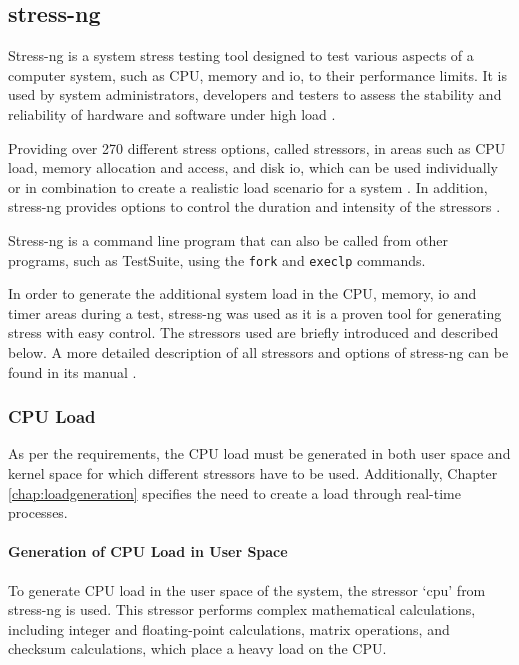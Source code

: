 \subsection{stress-ng} 
Stress-ng is a  system stress testing tool designed to test various aspects of a computer system, such as \ac{CPU}, memory and \ac{io}, to their performance limits. It is used by system administrators, developers and testers to assess the stability and reliability of hardware and software under high load \cite{stress01}.

Providing over 270 different stress options, called stressors, in areas such as \ac{CPU} load, memory allocation and access, and disk \ac{io}, which can be used individually or in combination to create a realistic load scenario for a system \cite{stress02}. In addition, stress-ng provides options to control the duration and intensity of the stressors \cite{stress03}.

Stress-ng is a command line program that can also be called from other programs, such as TestSuite, using the \texttt{fork} \cite{stress04} and \texttt{execlp} \cite{stress05} commands.

In order to generate the additional system load in the \ac{CPU}, memory, \ac{io} and timer areas during a test, stress-ng was used as it is a proven tool for generating stress with easy control. The stressors used are briefly introduced and described below. A more detailed description of all stressors and options of stress-ng can be found in its manual \cite{stress03}.

\subsubsection{CPU Load} \label{chap:stressngCPU}
As per the requirements, the \ac{CPU} load must be generated in both user space and kernel space for which different stressors have to be used. Additionally, Chapter \ref{chap:loadgeneration} specifies the need to create a load through real-time processes.

\paragraph{Generation of \ac{CPU} Load in User Space} \label{chap:CPUStressor}
To generate \ac{CPU} load in the user space of the system, the stressor `cpu' from stress-ng is used. This stressor performs complex mathematical calculations, including integer and floating-point calculations, matrix operations, and checksum calculations, which place a heavy load on the \ac{CPU}.

